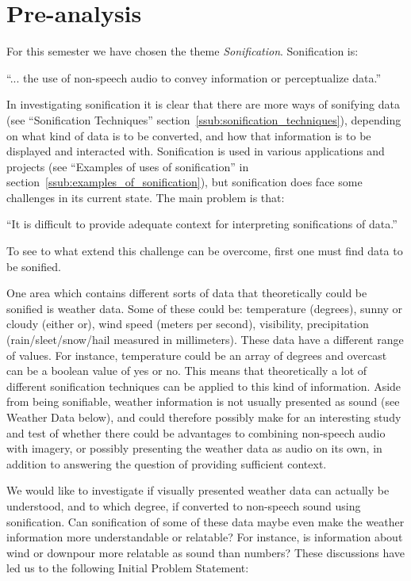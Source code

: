 
\section{Pre-analysis} %
\label{sec:preanalysis}

For this semester we have chosen the theme \emph{Sonification}. Sonification is: 

\enquote{... the use of non-speech audio to convey information or perceptualize data.}~\cite*{Wiki2014-2}

In investigating sonification it is clear that there are more ways of sonifying data (see \enquote{Sonification Techniques} section~\ref{ssub:sonification_techniques}), depending on what kind of data is to be converted, and how that information is to be displayed and interacted with. Sonification is used in various applications and projects (see \enquote{Examples of uses of sonification} in section~\ref{ssub:examples_of_sonification}), but sonification does face some challenges in its current state. The main problem is that:

\enquote{It is difficult to provide adequate context for interpreting sonifications of data.}~\cite*{Wiki2014-2}

To see to what extend this challenge can be overcome, first one must find data to be sonified.


One area which contains different sorts of data that theoretically could be sonified is weather data. 
Some of these could be: temperature (degrees), sunny or cloudy (either or), wind speed (meters per second), visibility, precipitation (rain/sleet/snow/hail measured in millimeters). 
These data have a different range of values. 
For instance, temperature could be an array of degrees and overcast can be a boolean value of yes or no. 
This means that theoretically a lot of different sonification techniques can be applied to this kind of information. 
Aside from being sonifiable, weather information is not usually presented as sound (see Weather Data below), and could therefore possibly make for an interesting study and test of whether there could be advantages to combining non-speech audio with imagery, or possibly presenting the weather data as audio on its own, in addition to answering the question of providing sufficient context.

We would like to investigate if visually presented weather data can actually be understood, and to which degree, if converted to non-speech sound using sonification. 
Can sonification of some of these data maybe even make the weather information more understandable or relatable?
For instance, is information about wind or downpour more relatable as sound than numbers? 
These discussions have led us to the following Initial Problem Statement:


